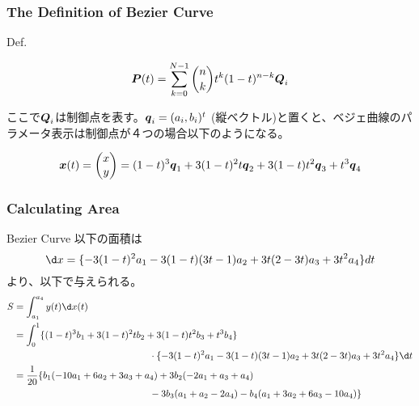 \documentclass{ltjsarticle}
\begin{document}
\subsubsection{The Definition of Bezier Curve}
Def.

\begin{equation}
  \vb*{P}(t)=\sum_{k=0}^{N-1}\binom{n}{k}t^k(1-t)^{n-k}\vb*{Q}_i
\end{equation}

ここで$\vb*{Q}_i$は制御点を表す。$\vb*{q}_i=(a_i,b_i)^t$ (縦ベクトル)と置くと、ベジェ曲線のパラメータ表示は制御点が４つの場合以下のようになる。

\begin{equation}
  \vb*{x}(t)=
  \begin{pmatrix}
    x \\ y  
  \end{pmatrix}
  =(1-t)^3\vb*{q}_1+3(1-t)^2t\vb*{q}_2+3(1-t)t^2\vb*{q}_3+t^3\vb*{q}_4
\end{equation}
\subsubsection{Calculating Area}
Bezier Curve 以下の面積は
\begin{equation}
  \d x=\{-3(1-t)^2a_1-3(1-t)(3t-1)a_2+3t(2-3t)a_3+3t^2a_4\}dt
\end{equation}
より、以下で与えられる。
\begin{equation}
  \begin{split}
    S&=\int_{a_1}^{a_4}y(t)\d x(t)\\
    &=\int_{0}^{1}\{(1-t)^3b_1+3(1-t)^2tb_2+3(1-t)t^2b_3+t^3b_4\}\\
    & \hspace{5cm}\cdot \{-3(1-t)^2a_1-3(1-t)(3t-1)a_2+3t(2-3t)a_3+3t^2a_4\}\d t\\
    &=\frac{1}{20}\{b_1(-10a_1+6a_2+3a_3+a_4)+3b_2(-2a_1+a_3+a_4)\\
    & \hspace{5cm}-3b_3(a_1+a_2-2a_4)-b_4(a_1+3a_2+6a_3-10a_4)\}\\
  \end{split}
\end{equation}
\end{document}
